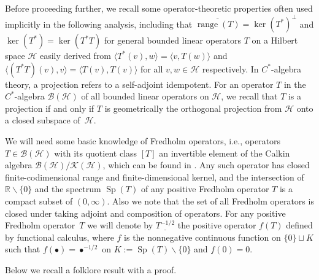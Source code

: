 Before proceeding further, we recall some operator-theoretic properties often
used implicitly in the following analysis, including that $\overline
{\operatorname{range}(T) }=\ker ( T^{\ast} )
^{\perp}$ and $\ker (T^{\ast} ) =\ker ( T^{\ast}T ) $
for general bounded linear operators $T$ on a Hilbert space $\mathcal{H}$
easily derived from $ \langle T^{\ast}(v) ,w \rangle
= \langle v,T(w) \rangle $ and $ \langle (
T^{\ast}T ) (v) ,v \rangle = \langle T (
v ) ,T(v) \rangle $ for all $v,w\in\mathcal{H}$
respectively. In $C^*$-algebra theory, a projection refers to a self-adjoint
idempotent. For an operator $T$ in the $C^*$-algebra $\mathcal{B} (
\mathcal{H} ) $ of all bounded linear operators on $\mathcal{H}$, we
recall that $T$ is a projection if and only if $T$ is geometrically the
orthogonal projection from $\mathcal{H}$ onto a closed subspace of~$\mathcal{H}$.

We will need some basic knowledge of Fredholm operators, i.e., operators
$T\in\mathcal{B} ( \mathcal{H} ) $ with its quotient class $ [
T ] $ an invertible element of the Calkin algebra $\mathcal{B} (
\mathcal{H} ) /\mathcal{K} ( \mathcal{H} ) $, which can be
found in \cite{Do,Mu}. Any such operator has
closed finite-codimensional range and finite-dimensional kernel, and the
intersection of $\mathbb{R}\backslash \{ 0 \} $ and the spectrum
$\operatorname{Sp}(T) $ of any positive Fredholm operator $T$
is a compact subset of $ ( 0,\infty ) $. Also we note that the set
of all Fredholm operators is closed under taking adjoint and composition of operators.
For any positive Fredholm operator~$T$ we will denote by $\underline{T^{-1/2}}$
the positive
operator $f(T) $ defined by functional calculus, where $f$
is the nonnegative continuous function on $ \{ 0 \} \sqcup K$
such that $f ( \bullet ) =\bullet^{-1/2}$ on $K:=\operatorname{Sp}(T) \backslash \{ 0 \} $ and $f (
0 ) =0$.

Below we recall a folklore result with a proof.

